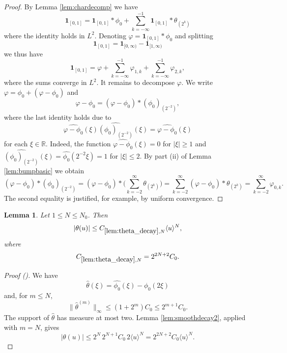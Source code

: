 \documentclass[12pt,reqno]{amsart}
\newcommand{\auto}{{({\tiny\faCar})}}
\theoremstyle{plain}
\newtheorem{lemma}[theorem]{Lemma}
\numberwithin{equation}{section}
\theoremstyle{remark}
\newcommand{\using}[1]{}
\newcommand{\R}{{\mathbb R}}
\newcommand{\pd}[1]{{\color{blue}{[P: #1]}}}
\begin{document}
\begin{proof}
By Lemma \ref{lem:chardecomp} we have
\begin{equation}
    \label{eq:L2char}
    \mathbf{1}_{[0,1]} =\mathbf{1}_{[0,1]}\ast\phi_0  +  \sum_{k=-\infty}^{-1} \mathbf{1}_{[0,1]}\ast  \theta_{(2^k)}
\end{equation}
where the identity holds in $L^2$.
Denoting $\varphi=\mathbf{1}_{[0,1]}\ast\phi_0$ and splitting
\[\mathbf{1}_{[0,1]} = \mathbf{1}_{[0,\infty)} - \mathbf{1}_{[1,\infty)}\]
 we  thus have
\[\mathbf{1}_{[0,1]} = \varphi +  \sum_{k=-\infty}^{-1} \varphi_{1,k}+ \sum_{k=-\infty}^{-1}\varphi_{2,k},\]
where the sums converge in $L^2$.
It remains to decompose $\varphi$.
We  write $\varphi= \phi_0 + (\varphi-\phi_0)$
and
\[
\varphi-\phi_0 = (\varphi - \phi_0)*(\phi_0)_{(2^{-2})},\]
where the last identity holds due to
\[\widehat{\varphi-\phi_0}(\xi) \widehat{(\phi_0)_{(2^{-2})}}(\xi) = \widehat{\varphi-\phi_0}(\xi) \]
for each $\xi\in \R$. Indeed, the function $\widehat{\varphi-\phi_0}(\xi)=0$ for $|\xi|\ge 1$ and $\widehat{(\phi_0)_{(2^{-2})}}(\xi) = \widehat{\phi_0}(2^{-2}\xi) =1$ for $|\xi|\le 2$.
By part (ii) of Lemma \ref{lem:bumpbasic} we obtain
\[ (\varphi - \phi_0)*(\phi_0)_{(2^{-2})} =  (\varphi - \phi_0)*\Big( \sum_{k=-2}^\infty \theta_{(2^k)}\Big )  =  \sum_{k=-2}^\infty (\varphi - \phi_0)*\theta_{(2^k)} =   \sum_{k=-2}^\infty \varphi_{0,k}.
\]
The  second equality is justified, for example, by uniform convergence.
\end{proof}


\pd{Revise constants using the new estimates on bumps}

\begin{lemma}\label{lem:theta_decay}\using{lem:smoothdecay2}
Let $1\le N\le N_0$. Then
\begin{equation}\label{auto:theta-decay}
|\theta(u)|\le C_{\ref{lem:theta_decay},N}\langle u\rangle^N,
\end{equation}
where
\begin{equation}\label{auto:theta-decay-constant-definition}
C_{\ref{lem:theta_decay},N}=2^{2N+2}C_0.
\end{equation}
\end{lemma}
\begin{proof}[Proof \auto]
We have
\[
\widehat\theta(\xi)=\widehat{\phi_0}(\xi)-\widehat{\phi_0}(2\xi)
\]
and, for $m\le N$,
\[
\|\widehat\theta^{(m)}\|_\infty
\le(1+2^m)C_0\le2^{m+1}C_0.
\]
The support of $\widehat\theta$ has measure at most two. Lemma \ref{lem:smoothdecay2}, applied with $m=N$, gives
\[
|\theta(u)|
\le2^N\,2^{N+1}C_0\,2\langle u\rangle^N
=2^{2N+2}C_0\langle u\rangle^N.
\]
\end{proof}
\end{document}
